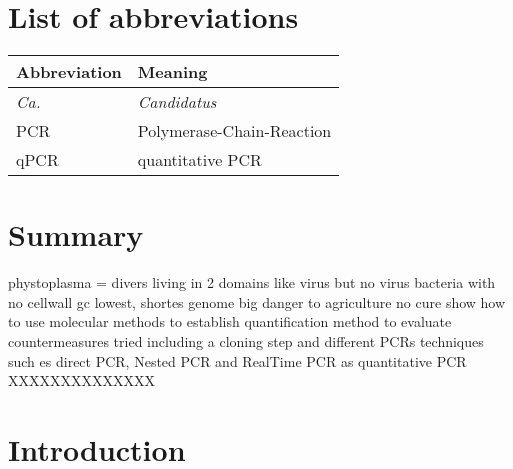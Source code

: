 \documentclass[a4paper]{article}
\renewcommand{\headrulewidth}{0pt}
\begin{document}
\pagebreak

\tableofcontents

\pagebreak

\section*{List of abbreviations}

\begin{table}[!h]
\centering
{ 
\begin{tabular} { l  l }
Abbreviation & Meaning \\ \hline
\textit{Ca.}& \textit{Candidatus}\\
PCR & Polymerase-Chain-Reaction \\
qPCR & quantitative PCR\\



\end{tabular}}
\end{table}
\pagebreak

\renewcommand{\cftfignumwidth}{6em}
\renewcommand{\cftfigpresnum}{Figure}
\listoffigures

\pagebreak

\renewcommand{\cfttabnumwidth}{6em}
\renewcommand{\cfttabpresnum}{Table}
\listoftables

\pagebreak


\fancyfoot[C]{\thepage}
\fancyhead[C]{\leftmark}
\renewcommand{\headrulewidth}{0.5pt} 

\section{Summary}

phystoplasma = divers
living in 2 domains like virus but no virus
bacteria with no cellwall
gc lowest, shortes genome
big danger to agriculture no cure
show how to use molecular methods to 
 establish quantification method to evaluate countermeasures tried 
including a cloning step and different PCRs techniques such es direct PCR, Nested PCR and RealTime PCR as quantitative PCR
XXXXXXXXXXXXXX
\pagebreak

\section{Introduction}
\end{document}
